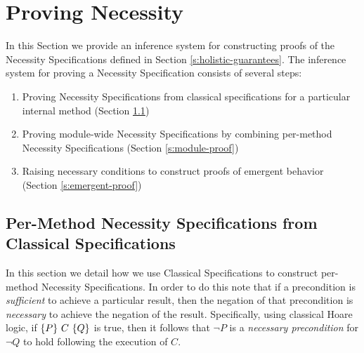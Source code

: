 \section{Proving Necessity}  
\label{s:inference}

In this Section we provide an inference system for constructing 
proofs of the Necessity Specifications defined in Section \ref{s:holistic-guarantees}.
The inference system for proving a Necessity Specification consists of several steps:
\begin{enumerate} 
\item
Proving Necessity Specifications from classical specifications for a particular internal method (Section \ref{s:classical-proof})
\item
Proving module-wide Necessity Specifications by combining per-method Necessity Specifications (Section \ref{s:module-proof})
\item
Raising necessary conditions to construct proofs of emergent behavior (Section \ref{s:emergent-proof})
\end{enumerate}

\subsection{Per-Method Necessity Specifications from Classical Specifications}
\label{s:classical-proof}
In this section we detail how we use Classical Specifications
to construct per-method Necessity Specifications. In order to do this
note that if a precondition is \emph{sufficient}
to achieve a particular result, then the negation of that precondition
is \emph{necessary} to achieve the negation of the result. Specifically, 
using classical Hoare logic, if $\{P\}\ C\ \{Q\}$ is true, then 
it follows that $\neg P$ is a \emph{necessary precondition} for $\neg Q$ to 
hold following the execution of $C$.

